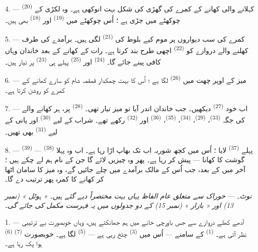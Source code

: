 4. ---  \textsuperscript{(20)} کہلانے والی
کھانے کے کمرے کی گھڑی کی شکل بہت انوکھی ہے۔ وہ لکڑی کے چوکھٹے میں
جڑی ہے ؛ اُس چوکھٹے میں 
\textsuperscript{(19)} اور  \textsuperscript{(18)}
بھی ہیں۔

\VUsaut{4.6mm}
\VUsaut{3.0mm}

5. --- کمرے کی سب دیواروں پر موم کیے بلوط کی  \textsuperscript{(21)} لگی ہیں۔ برآمدے کی طرف کھلنے والے
دروازے کو  \textsuperscript{(22)} اچھی طرح بند
کرتا ہے۔ رات کے کھانے کے بعد خاندان وہاں کافی پینے جائے گا۔
 \textsuperscript{(24)} اور 
\textsuperscript{(25)} پہلے ہی 
\textsuperscript{(23)} پر تیار ہیں۔

6. --- میز کے اوپر چھت میں  \textsuperscript{(26)}
لگا ہے ؛ اُس کا بہت چمکدار قمقمہ شام کو سارے کھانے کے کمرے کو روشن
کرتا ہے۔

7. --- اب خود  \textsuperscript{(27)} دیکھیں۔ جب
خاندان اندر آیا تو میز تیار تھی۔ 
\textsuperscript{(28)} پر، ہر کھانے والے کی جگہ 
\textsuperscript{(33)}،  \textsuperscript{(29)}،
 \textsuperscript{(34)}، 
\textsuperscript{(35)}،  \textsuperscript{(36)} اور
 \textsuperscript{(32)} رکھے تھے۔ شراب کے لیے
 \textsuperscript{(30)} اور پانی کے لیے
 \textsuperscript{(31)} بھی تھیں۔

8. ---  \textsuperscript{(39)} پہلے  \textsuperscript{(37)} لایا ؛ اُس میں کچھ شوربہ اب تک بھاپ
اڑا رہا ہے۔ اب وہ پہلا  \textsuperscript{(38)} — گوشت
کا کھانا — پیش کر رہا ہے۔ پھر وہ چیزیں لائے گا جن کے نام ہم لے چکے
ہیں ؛ آخر میں  کے بعد، جب اُس کے مالک برآمدے میں چلے
جائیں گے، وہ میز کا سامان اٹھا کر کھانے کا کمرہ پھر ترتیب دے گا۔

\textit{نوٹ۔} --- \textit{خوراک سے متعلق عام الفاظ یہاں بہت}
\textit{مختصراً دیے گئے ہیں۔ « ہوٹل » (نمبر 13) اور « بازار »}
\textit{(نمبر 15) کے دو جدولوں میں یہ فہرست مکمل کی جائے گی۔}

\VUsaut{4.6mm}
\VUsaut{3.0mm}

1. --- آدھے کھلے دروازے سے جس باورچی خانے میں ہم جھانکتے ہیں، وہاں
خوبصورت بے ترتیبی نظر آتی ہے۔  \textsuperscript{(1)}
کے سامنے — اُس میں  \textsuperscript{(3)} چٹخ رہی ہے —
 \textsuperscript{(5)} لگا ہے۔ خوبصورت
 \textsuperscript{(7)} 
\textsuperscript{(6)} ہوا پک رہا ہے۔

